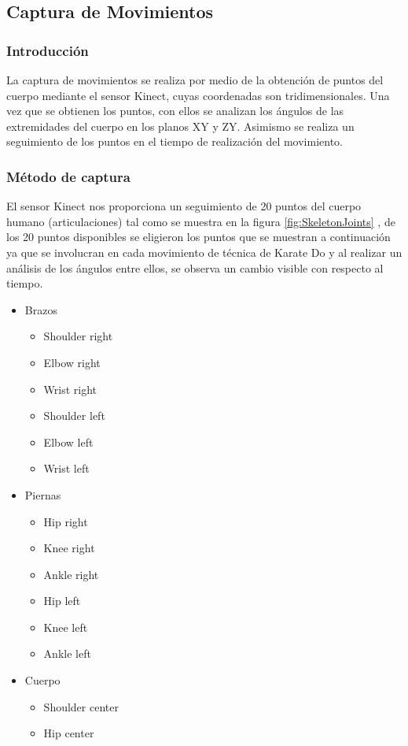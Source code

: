 \subsection{Captura de Movimientos}

\subsubsection{Introducción}
La captura de movimientos se realiza por medio de la obtención de puntos del cuerpo mediante el sensor Kinect, cuyas coordenadas son tridimensionales. Una vez que se obtienen los puntos, con ellos se analizan los ángulos de las extremidades del cuerpo en los planos XY y ZY. Asimismo se realiza un seguimiento de los puntos en el tiempo de realización del movimiento.\\

\subsubsection{Método de captura}
\label{sec:Captura}
El sensor Kinect nos proporciona un seguimiento de 20 puntos del cuerpo humano (articulaciones) tal como se muestra en la figura \ref{fig:SkeletonJoints} , de los 20 puntos disponibles se eligieron los puntos que se muestran a continuación ya que se involucran en cada movimiento de técnica de Karate Do y al realizar un análisis de los ángulos entre ellos, se observa un cambio visible con respecto al tiempo.

\begin{itemize} \itemsep1pt \parskip0pt 
	\item Brazos
	\begin{itemize} \itemsep1pt \parskip0pt 
		\item Shoulder right
		\item Elbow right
		\item Wrist right
		\item Shoulder left
		\item Elbow left
		\item Wrist left
	\end{itemize}
	\item Piernas
	\begin{itemize} \itemsep1pt \parskip0pt 
		\item Hip right
		\item Knee right
		\item Ankle right
		\item Hip left
		\item Knee left
		\item Ankle left
	\end{itemize}
	\item Cuerpo
	\begin{itemize} \itemsep1pt \parskip0pt 
		\item Shoulder center
		\item Hip center
	\end{itemize}
\end{itemize}

